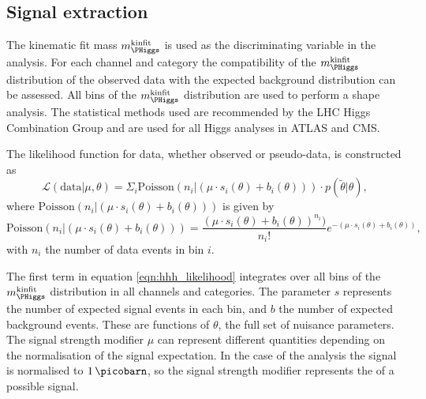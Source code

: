 \subsection{Signal extraction}
\label{sec:hhh_results_extraction}
The kinematic fit mass $m_{\PHiggs}^{\text{kinfit}}$ is used as the discriminating variable in the \Htohh analysis.
For each channel and category the compatibility of the $m_{\PHiggs}^{\text{kinfit}}$ distribution
of the observed data with the expected background distribution can be assessed. All bins
of the $m_{\PHiggs}^{\text{kinfit}}$ distribution are used to perform a shape analysis. The 
statistical methods used are recommended by the LHC Higgs Combination Group \cite{LHCHComb2011} 
and are used for all Higgs analyses in ATLAS and CMS. 

The likelihood function for data, whether observed or pseudo-data, is constructed as 
\begin{equation} \label{eqn:hhh_likelihood}
\mathcal{L}(\text{data}|\mu, \theta) = \Sigma_i\text{Poisson}(n_{i}|(\mu\cdot s_i(\theta) + b_i(\theta)) )\cdot p(\tilde{\theta}|\theta),
\end{equation}
where $\text{Poisson}(n_{i}|(\mu\cdot s_i(\theta)+b_i(\theta)))$ is given by
\begin{equation}\label{eqn:hhh_poisson}
\text{Poisson}(n_{i}|(\mu\cdot s_i(\theta)+b_i(\theta))) = \frac{(\mu\cdot s_i(\theta) + b_i(\theta))^{n_i})}{n_i!}e^{-(\mu\cdot s_i(\theta)+b_i(\theta))},
\end{equation}
with $n_i$ the number of 
data events in bin $i$.

The first term in equation \ref{eqn:hhh_likelihood} integrates over all bins of the $m_{\PHiggs}^{\text{kinfit}}$ distribution 
in all channels and categories. The parameter $s$ represents the number of expected signal events
in each bin, and $b$ the number of expected background events. These are functions of 
$\theta$, the full set of nuisance parameters. The signal strength
modifier $\mu$ can represent different quantities depending on the normalisation of the 
signal expectation. In the case of the \Htohhtobbtautau analysis the signal is normalised
to $1\,\picobarn$, so the signal strength modifier represents
the \xsbr of a possible signal.

